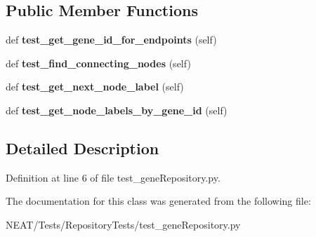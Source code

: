 \subsection*{Public Member Functions}
\begin{DoxyCompactItemize}
\item 
def {\bfseries test\+\_\+get\+\_\+gene\+\_\+id\+\_\+for\+\_\+endpoints} (self)\hypertarget{class_n_e_a_t___py_genetics_1_1_n_e_a_t_1_1_tests_1_1_repository_tests_1_1test__gene_repository_1_1_test_gene_repository_a9688b85e7f9a1eade7514bee5e4976e1}{}\label{class_n_e_a_t___py_genetics_1_1_n_e_a_t_1_1_tests_1_1_repository_tests_1_1test__gene_repository_1_1_test_gene_repository_a9688b85e7f9a1eade7514bee5e4976e1}

\item 
def {\bfseries test\+\_\+find\+\_\+connecting\+\_\+nodes} (self)\hypertarget{class_n_e_a_t___py_genetics_1_1_n_e_a_t_1_1_tests_1_1_repository_tests_1_1test__gene_repository_1_1_test_gene_repository_a1e243ceab606dbf34e054672cb2695b3}{}\label{class_n_e_a_t___py_genetics_1_1_n_e_a_t_1_1_tests_1_1_repository_tests_1_1test__gene_repository_1_1_test_gene_repository_a1e243ceab606dbf34e054672cb2695b3}

\item 
def {\bfseries test\+\_\+get\+\_\+next\+\_\+node\+\_\+label} (self)\hypertarget{class_n_e_a_t___py_genetics_1_1_n_e_a_t_1_1_tests_1_1_repository_tests_1_1test__gene_repository_1_1_test_gene_repository_af1ecb2f51fa36fee4c9dc2b8e9b49348}{}\label{class_n_e_a_t___py_genetics_1_1_n_e_a_t_1_1_tests_1_1_repository_tests_1_1test__gene_repository_1_1_test_gene_repository_af1ecb2f51fa36fee4c9dc2b8e9b49348}

\item 
def {\bfseries test\+\_\+get\+\_\+node\+\_\+labels\+\_\+by\+\_\+gene\+\_\+id} (self)\hypertarget{class_n_e_a_t___py_genetics_1_1_n_e_a_t_1_1_tests_1_1_repository_tests_1_1test__gene_repository_1_1_test_gene_repository_a8928178404a7f810e00610192a8fd368}{}\label{class_n_e_a_t___py_genetics_1_1_n_e_a_t_1_1_tests_1_1_repository_tests_1_1test__gene_repository_1_1_test_gene_repository_a8928178404a7f810e00610192a8fd368}

\end{DoxyCompactItemize}


\subsection{Detailed Description}


Definition at line 6 of file test\+\_\+gene\+Repository.\+py.



The documentation for this class was generated from the following file\+:\begin{DoxyCompactItemize}
\item 
N\+E\+A\+T/\+Tests/\+Repository\+Tests/test\+\_\+gene\+Repository.\+py\end{DoxyCompactItemize}
